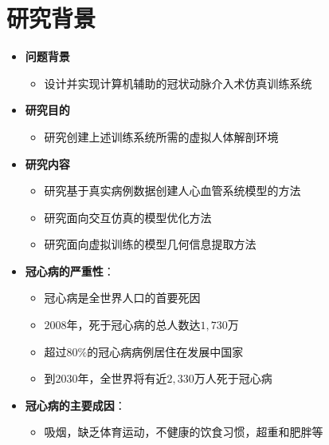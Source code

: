 \section{研究背景}

\begin{frame}
\begin{itemize}
\item \textbf{问题背景}
\begin{itemize}
\item 设计并实现计算机辅助的冠状动脉介入术仿真训练系统
\end{itemize}
\end{itemize}
\begin{itemize}
\item \textbf{研究目的}
\begin{itemize}
\item 研究创建上述训练系统所需的虚拟人体解剖环境
\end{itemize}
\end{itemize}
\begin{itemize}
\item \textbf{研究内容}
\begin{itemize}
\item 研究基于真实病例数据创建人心血管系统模型的方法
\item 研究面向交互仿真的模型优化方法
\item 研究面向虚拟训练的模型几何信息提取方法
\end{itemize}
\end{itemize}
\end{frame}

\begin{frame}
\begin{itemize}
\item \textbf{冠心病的严重性}：
\begin{itemize}
\item 冠心病是全世界人口的首要死因
\item $2008$年，死于冠心病的总人数达$1,730$万
\item 超过$80 \%$的冠心病病例居住在发展中国家
\item 到$2030$年，全世界将有近$2,330$万人死于冠心病
\end{itemize}
\end{itemize}
\begin{itemize}
\item \textbf{冠心病的主要成因}：
\begin{itemize}
\item 吸烟，缺乏体育运动，不健康的饮食习惯，超重和肥胖等
\end{itemize}
\end{itemize}
\end{frame}

